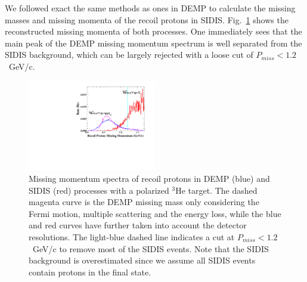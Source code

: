 We followed exact the same methods as ones in DEMP to calculate the missing
masses and missing momenta of the recoil protons in SIDIS.
Fig.~\ref{missing_mom} shows the reconstructed missing momenta of both
processes.  One immediately sees that the main peak of the DEMP missing
momentum spectrum is well separated from the SIDIS background, which can be
largely rejected with a loose cut of $P_{miss}<1.2$~GeV/c.
\begin{figure}[!ht]
\begin{center}
\includegraphics[type=pdf,ext=.pdf,read=.pdf,width=0.5\textwidth]
{./figures/missing_mom_cut}
\caption[Missing Momentum]{\footnotesize{Missing momentum spectra of recoil
    protons in DEMP (blue) and SIDIS (red) processes with a polarized $^{3}$He
    target. The dashed magenta curve is the DEMP missing mass only considering
    the Fermi motion, multiple scattering and the energy loss, while the blue
    and red curves have further taken into account the detector
    resolutions. The light-blue dashed line indicates a cut at
    $P_{miss}<1.2$~GeV/c to remove most of the SIDIS events.  Note that the
    SIDIS background is overestimated since we assume all SIDIS events contain
    protons in the final state. }}
  \label{missing_mom}
  \end{center}
\end{figure}

